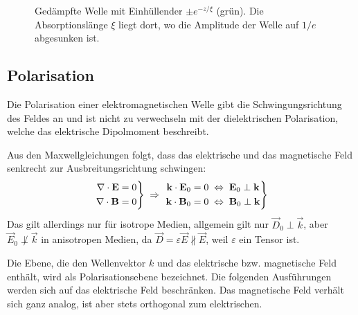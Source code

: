 \begin{figure}[htb]
    \centering
    \tfigDaempfungEMWelle
    \caption{Gedämpfte Welle mit Einhüllender $\pm e^{-z/\xi}$ (grün). Die Absorptionslänge $\xi$ liegt dort, wo die Amplitude der Welle auf $1/e$ abgesunken ist. }
    \label{fig:daempfung_em_welle}
\end{figure}


\subsection{Polarisation}

Die Polarisation einer elektromagnetischen Welle gibt die Schwingungsrichtung des Feldes an und ist nicht zu verwechseln mit der dielektrischen Polarisation, welche das elektrische Dipolmoment beschreibt.

Aus den Maxwellgleichungen folgt, dass das elektrische und das magnetische Feld senkrecht zur Ausbreitungsrichtung schwingen:
\begin{align*}
    \left. \begin{aligned} \nabla\cdot \mathbf{E} &=0 \\ \nabla\cdot \mathbf{B} &= 0\end{aligned} \right\} \;\Rightarrow\; \left. \begin{aligned} \mathbf{k}\cdot\mathbf{E}_0&=0\;\Leftrightarrow\; \mathbf{E}_0\perp\mathbf{k} \\ \mathbf{k}\cdot\mathbf{B}_0&=0\;\Leftrightarrow\;\mathbf{B}_0\perp\mathbf{k}\end{aligned}\right\}
\end{align*}
Das gilt allerdings nur für isotrope Medien, allgemein gilt nur $\vec D_0 \perp\vec k$, aber $\vec E_0 \not\perp\vec k$ in anisotropen Medien, da $\vec D=\varepsilon\vec E \nparallel\vec E$, weil $\varepsilon$ ein Tensor ist.

Die Ebene, die den Wellenvektor $k$ und das elektrische bzw. magnetische Feld enthält, wird als Polarisationsebene bezeichnet.
Die folgenden Ausführungen werden sich auf das elektrische Feld beschränken.
Das magnetische Feld verhält sich ganz analog, ist aber stets orthogonal zum elektrischen.

